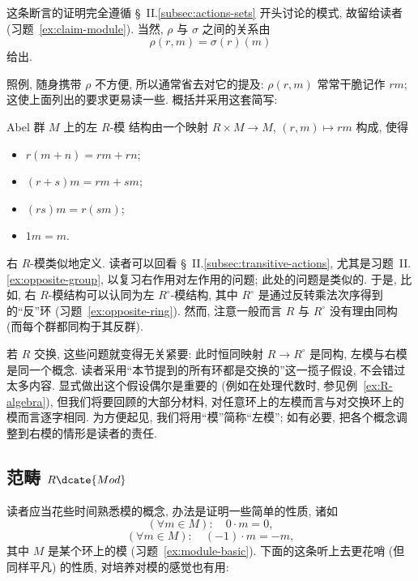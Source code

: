 这条断言的证明完全遵循 \S~II.\ref{subsec:actions-sets} 开头讨论的模式, 故留给读者 (习题~\ref{ex:claim-module}). 当然, $\rho$ 与 $\sigma$ 之间的关系由
\[
\rho(r, m) = \sigma(r)(m)
\]
给出.

照例, 随身携带 $\rho$ 不方便, 所以通常省去对它的提及: $\rho(r, m)$ 常常干脆记作 $rm$; 这使上面列出的要求更易读一些. 概括并采用这套简写:

\begin{definition}
\label{def:module}
Abel 群 $M$ 上的左 $R$-模%
结构由一个映射 $R \times M \to M$, $(r, m) \mapsto rm$ 构成, 使得
\begin{itemize}
	\item $r(m + n) = rm + rn$;
	\item $(r + s)m = rm + sm$;
	\item $(rs)m = r(sm)$;
	\item $1m = m$.
\end{itemize}
\end{definition}

右 $R$-模类似地定义. 读者可以回看 \S~II.\ref{subsec:transitive-actions}, 尤其是习题~II.\ref{ex:opposite-group}, 以复习右作用对左作用的问题; 此处的问题是类似的. 于是, 比如, 右 $R$-模结构可以认同为左 $R^{\circ}$-模结构, 其中 $R^{\circ}$ 是通过反转乘法次序得到的``反''环 (习题~\ref{ex:opposite-ring}). 然而, 注意一般而言 $R$ 与 $R^{\circ}$ 没有理由同构 (而每个群都同构于其反群).

若 $R$ 交换, 这些问题就变得无关紧要: 此时恒同映射 $R \rightarrow R^{\circ}$ 是同构, 左模与右模是同一个概念. 读者采用``本节提到的所有环都是交换的''这一揽子假设, 不会错过太多内容. 显式做出这个假设偶尔是重要的 (例如在处理代数时, 参见例~\ref{ex:R-algebra}), 但我们将要回顾的大部分材料, 对任意环上的左模而言与对交换环上的模而言逐字相同. 为方便起见, 我们将用``模''简称``左模''; 如有必要, 把各个概念调整到右模的情形是读者的责任.

\subsection{范畴 \texorpdfstring{$R\dcate{Mod}$}{R-Mod}}
\label{subsec:R-Mod-hom}

读者应当花些时间熟悉模的概念, 办法是证明一些简单的性质, 诸如
\[
(\forall m \in M): \quad 0 \cdot m = 0,
\]
\[
(\forall m \in M): \quad (-1) \cdot m = -m,
\]
其中 $M$ 是某个环上的模 (习题~\ref{ex:module-basic}). 下面的这条听上去更花哨 (但同样平凡) 的性质, 对培养对模的感觉也有用:

